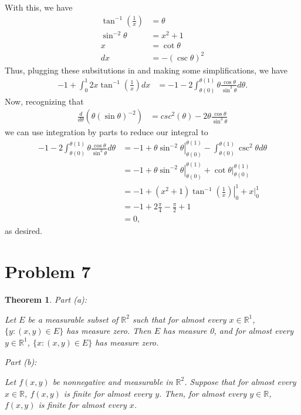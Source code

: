 \documentclass[10pt,a4paper]{article}
\makeatletter
\theoremstyle{theorem}
\newtheorem{theorem}{Theorem}
\newcommand{\proofpart}[2]{%
  \par
  \addvspace{\medskipamount}%
  \noindent\emph{Part #1: #2}\par\nobreak
  \addvspace{\smallskipamount}%
  \@afterheading
}
\theoremstyle{definition}
\makeatother
\begin{document}
With this, we have
\begin{align*}
\tan^{-1} \left(\frac{1}{x} \right) &= \theta\\
\sin^{-2} \theta &= x^2 + 1\\
x &= \cot \theta\\
dx &= - (\csc \theta)^2
\end{align*}
Thus, plugging these subsitutions in and making some simplifications, we have
\begin{align*}
-1 + \int_0^1 2x \tan^{-1}\left(\frac{1}{x}\right) dx &= -1 - 2 \int_{\theta(0)}^{\theta(1)} \theta \frac{\cos \theta}{\sin^3 \theta} d \theta.
\end{align*}
Now, recognizing that 
\begin{align*}
\frac{d}{d \theta} \left( \theta (\sin \theta)^{-2} \right) &= csc^2(\theta) - 2 \theta \frac{\cos \theta}{\sin^3 \theta}
\end{align*}
we can use integration by parts to reduce our integral to
\begin{align*}
-1 - 2 \int_{\theta(0)}^{\theta(1)} \theta \frac{\cos \theta}{\sin^3 \theta} d \theta &= -1 + \left. \theta \sin^{-2} \theta \right|_{\theta(0)}^{\theta(1)} - \int_{\theta(0)}^{\theta(1)} \csc^2 \theta d \theta \\
&= -1 + \left. \theta \sin^{-2} \theta \right|_{\theta(0)}^{\theta(1)} + \left. \cot \theta \right|_{\theta(0)}^{\theta(1)}\\
&= -1 + \left. (x^2 + 1) \tan^{-1} \left(\frac{1}{x} \right) \right|_0^1 +  \left. x \right|_0^1\\
&= -1 + 2\frac{\pi}{4} - \frac{\pi}{2} + 1\\
&= 0,
\end{align*}
as desired.

\section{Problem 7}
\begin{theorem}
\proofpart{(a)}{} Let $E$ be a measurable subset of $\mathbb{R}^2$ such that for almost every $x \in \mathbb{R}^1$, $\{y : (x, y) \in E \}$ has measure zero. Then $E$ has measure 0, and for almost every $y \in \mathbb{R}^1$, $\{x : (x, y) \in E \}$ has measure zero. 
\proofpart{(b)}{} Let $f(x, y)$ be nonnegative and measurable in $\mathbb{R}^2$. Suppose that for almost every $x \in \mathbb{R}$, $f(x, y)$ is finite for almost every $y$. Then, for almost every $y \in \mathbb{R}$, $f(x, y)$ is finite for almost every $x$.
\end{theorem}
\end{document}
